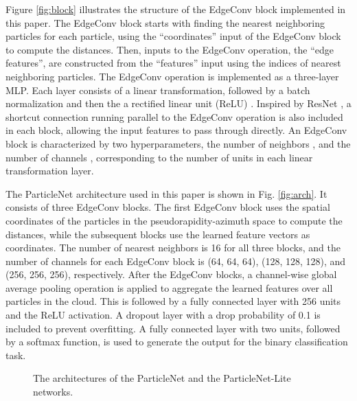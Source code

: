 \documentclass[aps,prd,longbibliography,reprint,amsmath,amssymb,amsfonts]{revtex4-1}
\begin{document}
Figure \ref{fig:block} illustrates the structure of the EdgeConv block implemented in this paper. The EdgeConv block starts with finding the  nearest neighboring particles for each particle, using the ``coordinates'' input of the EdgeConv block to compute the distances. Then, inputs to the EdgeConv operation, the ``edge features'', are constructed from the ``features'' input using the indices of  nearest neighboring particles. The EdgeConv operation is implemented as a three-layer MLP. Each layer consists of a linear transformation, followed by a batch normalization \cite{DBLP:journals/corr/IoffeS15} and then the a rectified linear unit (ReLU) \cite{glorot2011deep}. Inspired by ResNet \cite{he2016deep}, a shortcut connection running parallel to the EdgeConv operation is also included in each block, allowing the input features to pass through directly. An EdgeConv block is characterized by two hyperparameters, the number of neighbors , and the number of channels , corresponding to the number of units in each linear transformation layer.

The ParticleNet architecture used in this paper is shown in Fig. \ref{fig:arch}. It consists of three EdgeConv blocks. The first EdgeConv block uses the spatial coordinates of the particles in the pseudorapidity-azimuth space to compute the distances, while the subsequent blocks use the learned feature vectors as coordinates. The number of nearest neighbors  is 16 for all three blocks, and the number of channels  for each EdgeConv block is (64, 64, 64), (128, 128, 128), and (256, 256, 256), respectively. After the EdgeConv blocks, a channel-wise global average pooling operation is applied to aggregate the learned features over all particles in the cloud. This is followed by a fully connected layer with 256 units and the ReLU activation. A dropout layer \cite{srivastava2014dropout} with a drop probability of 0.1 is included to prevent overfitting. A fully connected layer with two units, followed by a softmax function, is used to generate the output for the binary classification task. 

\begin{figure}[htbp]
\centering
{}\hspace{10mm}
\caption{The architectures of the ParticleNet and the ParticleNet-Lite networks.}
\label{fig:networks}
\end{figure}
\end{document}
